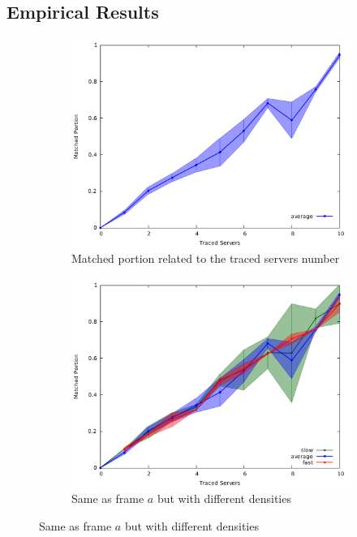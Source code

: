 \subsection{Empirical Results}
\begin{figure}
	\begin{subfigure}{.5\textwidth}
		\centering
		\includegraphics[width=1\linewidth]{graphs/s_server_mport_average_only.pdf}
		\caption{Matched portion related to the traced servers number}
		\label{fig:g_mporta}
	\end{subfigure} 
	\begin{subfigure}{.5\textwidth}
		\centering
		\includegraphics[width=1\linewidth]{graphs/s_server_mport.pdf}
		\caption{Same as frame $a$ but with different densities}
		\label{fig:g_mportb}
	\end{subfigure}


\end{figure}

